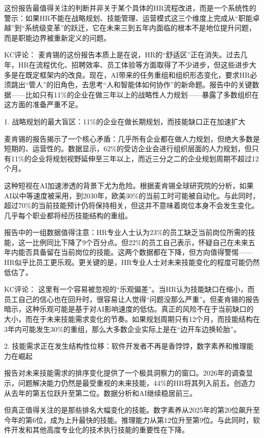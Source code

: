\documentclass[11pt]{ctexart}
\begin{document}
这份报告最值得关注的判断并非关于某个具体的HR流程改进，而是一个系统性的警示：如果HR不能在战略规划、技能管理、运营模式这三个维度上完成从“职能卓越”到“系统级变革”的跃迁，它在未来三到五年内面临的根本不是地位提升问题，而是职能边界被重新定义的问题。

KC评论： 麦肯锡的这份报告本质上是在说，HR的“舒适区”正在消失。过去几年，HR在流程优化、招聘效率、员工体验等方面取得了不少进步，但这些进步大多是在既定框架内的改良。现在，AI带来的任务重组和组织形态变化，要求HR必须跳出“管人”的旧角色，去思考“人和智能体如何协作”的新命题。报告中的关键数据——比如只有11\%的企业在做三年以上的战略性人力规划——暴露了多数组织在这方面的准备严重不足。

1. 战略规划的最大盲区：11\%的企业在做长期规划，而技能缺口正在加速扩大

麦肯锡的报告揭示了一个核心矛盾：几乎所有企业都在做人力规划，但绝大多数是短期的、运营性的。数据显示，62\%的受访企业会进行组织层面的人力规划，但只有11\%的企业将规划视野延伸至三年以上，而近三分之二的企业规划周期不超过12个月。

这种短视在AI加速渗透的背景下尤为危险。根据麦肯锡全球研究院的分析，如果AI以中等速度被采用，到2030年，欧美30\%的当前工时可能被自动化。与此同时，超过70\%的当前技能预计仍将保持相关，但这并不意味着岗位本身不会发生变化。几乎每个职业都将经历技能结构的重组。

报告中的一组数据值得注意：HR专业人士认为23\%的员工缺乏当前岗位所需的技能，这一比例同比下降了9个百分点。但22\%的员工自己表示，怀疑自己在未来五年内能否具备留在当前岗位的技能。这两个数据都在下降，但方向值得警惕——HR似乎比员工更乐观。更关键的是，HR专业人士对未来技能变化的程度可能仍然低估了。

KC评论： 这里有一个容易被忽视的“乐观偏差”。当HR认为技能缺口在缩小，而员工自己的信心也在回升时，很容易让人觉得“问题没那么严重”。但麦肯锡的报告暗示，这种乐观可能是基于对AI影响速度的低估。真正的风险不在于当前缺口的大小，而在于未来技能需求变化的节奏。如果规划周期只有12个月，而技能结构在3年内可能发生30\%的重组，那么大多数企业实际上是在“边开车边换轮胎”。

2. 技能需求正在发生结构性位移：软件开发者不再是香饽饽，数字素养和推理能力在崛起

报告对未来技能需求的排序变化提供了一个极具洞察力的窗口。2026年的调查显示，问题解决能力仍然是最受重视的未来技能，44\%的HR将其列入前五。创造力从去年的第五位跃升至第二位。数据分析和AI继续稳居前三。

但真正值得关注的是那些排名大幅变化的技能。数字素养从2025年的第20位飙升至今年的第6位，成为上升最快的技能。推理能力从第12位升至第9位。与此同时，软件开发和其他高度专业化的技术执行技能的重要性在下降。
\end{document}

